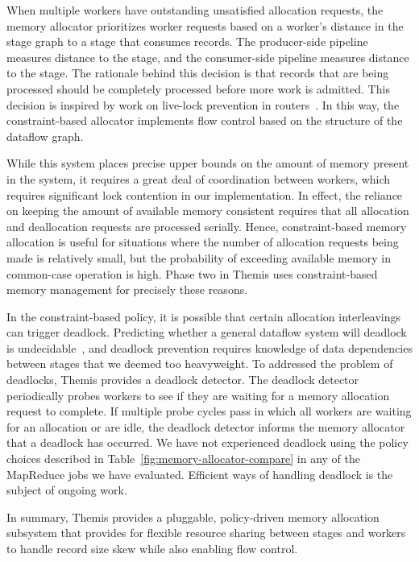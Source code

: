 When multiple workers have outstanding unsatisfied allocation requests, the
memory allocator prioritizes worker requests based on a worker's distance in
the stage graph to a stage that consumes records.  The producer-side pipeline
measures distance to the \sender stage, and the consumer-side pipeline measures
distance to the \writer stage.  The rationale behind this decision is that
records that are being processed should be completely processed before more
work is admitted. This decision is inspired by work on live-lock prevention in
routers~\cite{ReceiveLivelock}.  In this way, the constraint-based allocator
implements flow control based on the structure of the dataflow graph.

While this system places precise upper bounds on the amount of memory present
in the system, it requires a great deal of coordination between workers, which
requires significant lock contention in our implementation.  In effect, the
reliance on keeping the amount of available memory consistent requires that all
allocation and deallocation requests are processed serially. Hence,
constraint-based memory allocation is useful for situations where the number of
allocation requests being made is relatively small, but the probability of
exceeding available memory in common-case operation is high.  Phase two in
Themis uses constraint-based memory management for precisely these reasons.

In the constraint-based policy, it is possible that certain allocation
interleavings can trigger deadlock.  Predicting whether a general dataflow
system will deadlock is undecidable~\cite{NajjarLeeGao}, and deadlock
prevention requires knowledge of data dependencies between stages that we
deemed too heavyweight. To addressed the problem of deadlocks, Themis provides
a deadlock detector. The deadlock detector periodically probes workers to see
if they are waiting for a memory allocation request to complete. If multiple
probe cycles pass in which all workers are waiting for an allocation or are
idle, the deadlock detector informs the memory allocator that a
deadlock has occurred.  We have not experienced deadlock using the policy
choices described in Table~\ref{fig:memory-allocator-compare} in any of the
MapReduce jobs we have evaluated.  Efficient ways of handling deadlock is the
subject of ongoing work.

In summary, Themis provides a pluggable, policy-driven memory allocation
subsystem that provides for flexible resource sharing between stages and
workers to handle record size skew while also enabling flow control.
